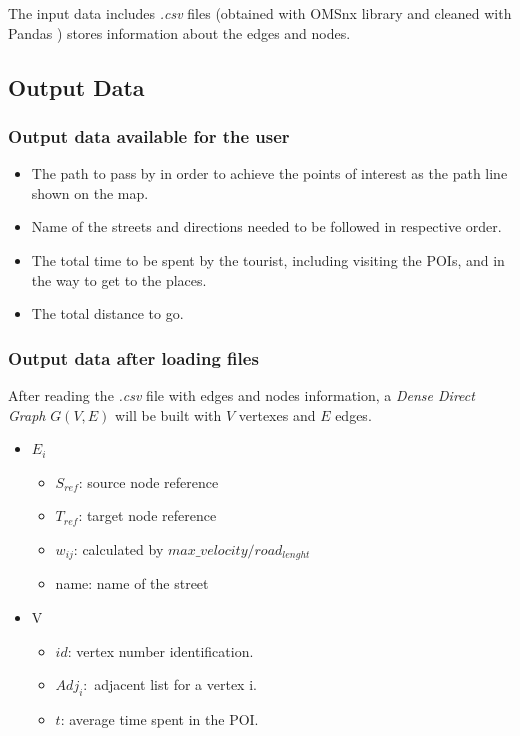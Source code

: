 \documentclass{article}
\begin{document}
The input data includes \textit{.csv} files (obtained with OMSnx library \cite{OSMnx} and cleaned with Pandas \cite{Pandas}) stores information about the edges and nodes. \newline

\subsection*{Output Data}
    \subsubsection*{Output data available for the user}
    \begin{itemize}
        \item The path to pass by in order to achieve the points of interest as the path line shown on the map.
        \item Name of the streets and directions needed to be followed in respective order.
        \item The total time to be spent by the tourist, including visiting the POIs, and in the way to get to the places.
        \item The total distance to go. 
    \end{itemize}
    
    \subsubsection*{Output data after loading files}
    After reading the \textit{.csv} file with edges and nodes information, a \textit{Dense Direct Graph} $G(V,E)$ will be built with $V$ vertexes and $E$ edges.
    

\begin{itemize} 

    \item $E_i$
    \begin{itemize}
        \item $S_{ref}$: source node reference 
        \item $T_{ref}$: target node reference
        \item $w_{ij}$: calculated by $max\_velocity/road_{lenght}$
        \item name: name of the street
    \end{itemize}
    
    \item V
    \begin{itemize}
        \item $id$: vertex number identification.
        \item $Adj_i: $ adjacent list for a vertex i.
        \item $t$: average time spent in the POI.
    \end{itemize} 
 
\end{itemize}       
\end{document}
